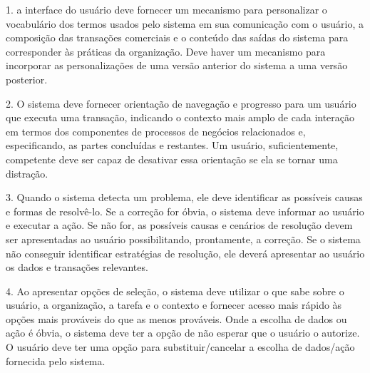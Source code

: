 \begin{flushright}
	\begin{minipage}{.96\textwidth}
		1.	a interface do usuário deve fornecer um mecanismo para personalizar o vocabulário dos termos usados pelo sistema em sua comunicação com o usuário, a composição das transações comerciais e o conteúdo das saídas do sistema para corresponder às práticas da organização. Deve haver um mecanismo para incorporar as personalizações de uma versão anterior do sistema a uma versão posterior.
	\end{minipage}
\end{flushright}

\begin{flushright}
	\begin{minipage}{.96\textwidth}
		2.	O sistema deve fornecer orientação de navegação e progresso para um usuário que executa uma transação, indicando o contexto mais amplo de cada interação em termos dos componentes de processos de negócios relacionados e, especificando, as partes concluídas e restantes. Um usuário, suficientemente, competente deve ser capaz de desativar essa orientação se ela se tornar uma distração.		
	\end{minipage}
\end{flushright}


\begin{flushright}
	\begin{minipage}{.96\textwidth}
		3.	Quando o sistema detecta um problema, ele deve identificar as possíveis causas e formas de resolvê-lo. Se a correção for óbvia, o sistema deve informar ao usuário e executar a ação. Se não for, as possíveis causas e cenários de resolução devem ser apresentadas ao usuário possibilitando, prontamente, a correção. Se o sistema não conseguir identificar estratégias de resolução, ele deverá apresentar ao usuário os dados e transações relevantes.		
	\end{minipage}
\end{flushright}


\begin{flushright}
	\begin{minipage}{.96\textwidth}
		4.	Ao apresentar opções de seleção, o sistema deve utilizar o que sabe sobre o usuário, a organização, a tarefa e o contexto e fornecer acesso mais rápido às opções mais prováveis do que as menos prováveis. Onde a escolha de dados ou ação é óbvia, o sistema deve ter a opção de não esperar que o usuário o autorize. O usuário deve ter uma opção para substituir/cancelar a escolha de dados/ação fornecida pelo sistema.		
	\end{minipage}
\end{flushright}

